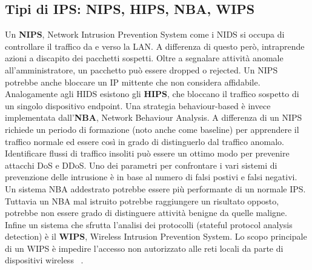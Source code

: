 \subsection{Tipi di IPS: NIPS, HIPS, NBA, WIPS}

Un \textbf{NIPS}, Network Intrusion Prevention System come i NIDS si occupa di controllare il traffico da e verso la LAN. A differenza di questo però, intraprende azioni a discapito dei pacchetti sospetti. Oltre a segnalare attività anomale all'amministratore, un pacchetto può essere dropped o rejected. Un NIPS potrebbe anche bloccare un IP mittente che non considera affidabile.
Analogamente agli HIDS esistono gli \textbf{HIPS}, che bloccano il traffico sospetto di un singolo dispositivo endpoint.
Una strategia behaviour-based è invece implementata dall'\textbf{NBA}, Network Behaviour Analysis. A differenza di un NIPS richiede un periodo di formazione (noto anche come baseline) per apprendere il traffico normale ed essere così in grado di distinguerlo dal traffico anomalo. Identificare flussi di traffico insoliti può essere un ottimo modo per prevenire attacchi DoS e DDoS. Uno dei parametri per confrontare i vari sistemi di prevenzione delle intrusione è in base al numero di falsi postivi e falsi negativi. Un sistema NBA addestrato potrebbe essere più performante di un normale IPS. Tuttavia un NBA mal istruito potrebbe raggiungere un risultato opposto, potrebbe non essere grado di distinguere attività benigne da quelle maligne.
Infine un sistema che sfrutta l'analisi dei protocolli (stateful protocol analysis detection) è il \textbf{WIPS}, Wireless Intrusion Prevention System. Lo scopo principale di un WIPS è impedire l'accesso non autorizzato alle reti locali da parte di dispositivi wireless ~\cite{tryhackme}.



